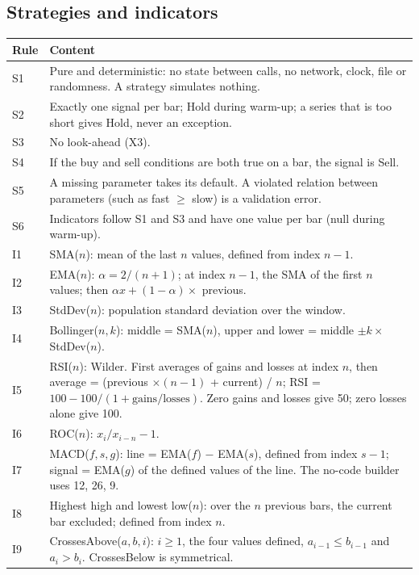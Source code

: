\documentclass[11pt,a4paper]{article}
\begin{document}
\subsection*{Strategies and indicators}
\begin{longtable}{@{}p{0.9cm}p{14.8cm}@{}}
\toprule
\textbf{Rule} & \textbf{Content} \\
\midrule
\endhead
S1 & Pure and deterministic: no state between calls, no network, clock, file or randomness. A strategy simulates nothing. \\
S2 & Exactly one signal per bar; Hold during warm-up; a series that is too short gives Hold, never an exception. \\
S3 & No look-ahead (X3). \\
S4 & If the buy and sell conditions are both true on a bar, the signal is Sell. \\
S5 & A missing parameter takes its default. A violated relation between parameters (such as fast $\geq$ slow) is a validation error. \\
S6 & Indicators follow S1 and S3 and have one value per bar (null during warm-up). \\
I1 & SMA($n$): mean of the last $n$ values, defined from index $n-1$. \\
I2 & EMA($n$): $\alpha = 2/(n+1)$; at index $n-1$, the SMA of the first $n$ values; then $\alpha x + (1-\alpha) \times$ previous. \\
I3 & StdDev($n$): population standard deviation over the window. \\
I4 & Bollinger($n,k$): middle = SMA($n$), upper and lower = middle $\pm k \times$ StdDev($n$). \\
I5 & RSI($n$): Wilder. First averages of gains and losses at index $n$, then average = (previous $\times (n-1)$ + current) / $n$; RSI = $100 - 100/(1 + \text{gains}/\text{losses})$. Zero gains and losses give 50; zero losses alone give 100. \\
I6 & ROC($n$): $x_i / x_{i-n} - 1$. \\
I7 & MACD($f,s,g$): line = EMA($f$) $-$ EMA($s$), defined from index $s-1$; signal = EMA($g$) of the defined values of the line. The no-code builder uses 12, 26, 9. \\
I8 & Highest high and lowest low($n$): over the $n$ previous bars, the current bar excluded; defined from index $n$. \\
I9 & CrossesAbove($a,b,i$): $i \geq 1$, the four values defined, $a_{i-1} \leq b_{i-1}$ and $a_i > b_i$. CrossesBelow is symmetrical. \\
\bottomrule
\end{longtable}
\end{document}
